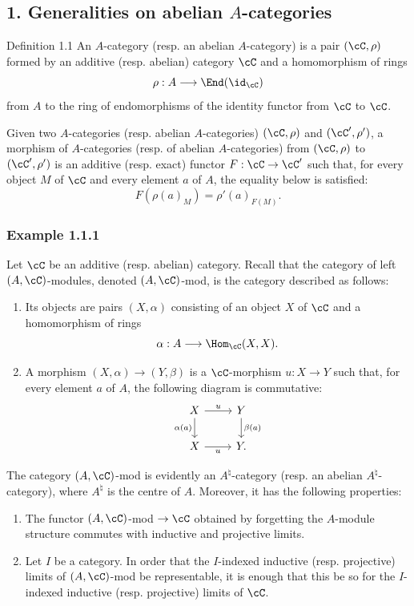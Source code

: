 \subsection*{1. Generalities on abelian $A$-categories}

\begin{statement}{Definition 1.1}
An $A$-category (resp. an abelian $A$-category) is a pair $(\cC,\rho)$ formed by an additive (resp. abelian) category $\cC$ and a homomorphism of rings
\[
\rho:A\longrightarrow \End(\id_{\cC})
\]
from $A$ to the ring of endomorphisms of the identity functor from $\cC$ to $\cC$.
\end{statement}

Given two $A$-categories (resp. abelian $A$-categories) $(\cC,\rho)$ and $(\cC',\rho')$, a morphism of $A$-categories (resp. of abelian $A$-categories) from $(\cC,\rho)$ to $(\cC',\rho')$ is an additive (resp. exact) functor $F:\cC\to\cC'$ such that, for every object $M$ of $\cC$ and every element $a$ of $A$, the equality below is satisfied:
\[
F(\rho(a)_M)=\rho'(a)_{F(M)}.
\]

\subsubsection*{Example 1.1.1}
Let $\cC$ be an additive (resp. abelian) category. Recall that the category of left $(A,\cC)$-modules, denoted $(A,\cC)$-mod, is the category described as follows:
\begin{enumerate}[label=(\roman*)]
\item Its objects are pairs $(X,\alpha)$ consisting of an object $X$ of $\cC$ and a homomorphism of rings
\[
\alpha:A\longrightarrow \Hom_{\cC}(X,X).
\]
\item A morphism $(X,\alpha)\to(Y,\beta)$ is a $\cC$-morphism $u:X\to Y$ such that, for every element $a$ of $A$, the following diagram is commutative:
\[
\begin{tikzcd}
X \arrow[r,"u"] \arrow[d,"\alpha(a)"'] & Y \arrow[d,"\beta(a)"]\\
X \arrow[r,"u"'] & Y .
\end{tikzcd}
\]
\end{enumerate}
The category $(A,\cC)$-mod is evidently an $A^{\natural}$-category (resp. an abelian $A^{\natural}$-category), where $A^{\natural}$ is the centre of $A$. Moreover, it has the following properties:
\begin{enumerate}[label=(\alph*)]
\item The functor $(A,\cC)$-mod $\to\cC$ obtained by forgetting the $A$-module structure commutes with inductive and projective limits.
\item Let $I$ be a category. In order that the $I$-indexed inductive (resp. projective) limits of $(A,\cC)$-mod be representable, it is enough that this be so for the $I$-indexed inductive (resp. projective) limits of $\cC$.
\end{enumerate}

